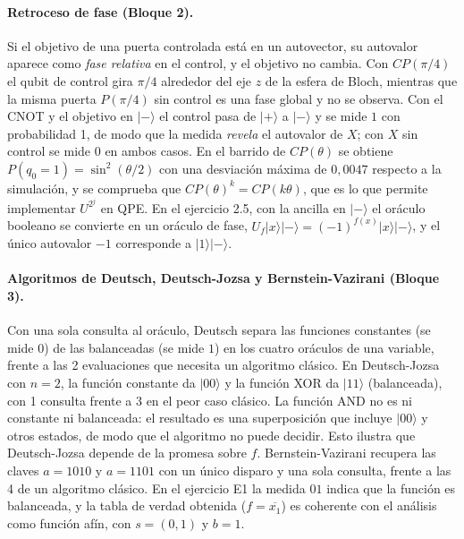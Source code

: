 \paragraph{Retroceso de fase (Bloque 2).} Si el objetivo de una puerta controlada está en un autovector, su autovalor aparece como \emph{fase relativa} en el control, y el objetivo no cambia.
Con $CP(\pi/4)$ el qubit de control gira $\pi/4$ alrededor del eje $z$ de la esfera de Bloch, mientras que la misma puerta $P(\pi/4)$ sin control es una fase global y no se observa.
Con el CNOT y el objetivo en $|{-}\rangle$ el control pasa de $|{+}\rangle$ a $|{-}\rangle$ y se mide $1$ con probabilidad 1, de modo que la medida \emph{revela} el autovalor de $X$;
con $X$ sin control se mide $0$ en ambos casos. En el barrido de $CP(\theta)$ se obtiene $P(q_0=1)=\sin^2(\theta/2)$ con una desviación máxima de $0{,}0047$ respecto a la simulación,
y se comprueba que $CP(\theta)^k=CP(k\theta)$, que es lo que permite implementar $U^{2^j}$ en QPE. En el ejercicio 2.5, con la ancilla en $|{-}\rangle$ el oráculo booleano se convierte
en un oráculo de fase, $U_f|x\rangle|{-}\rangle=(-1)^{f(x)}|x\rangle|{-}\rangle$, y el único autovalor $-1$ corresponde a $|1\rangle|{-}\rangle$.

\paragraph{Algoritmos de Deutsch, Deutsch-Jozsa y Bernstein-Vazirani (Bloque 3).} Con una sola consulta al oráculo, Deutsch separa las funciones constantes (se mide $0$) de las balanceadas (se mide $1$)
en los cuatro oráculos de una variable, frente a las 2 evaluaciones que necesita un algoritmo clásico. En Deutsch-Jozsa con $n=2$, la función constante da $|00\rangle$ y la función XOR
da $|11\rangle$ (balanceada), con 1 consulta frente a 3 en el peor caso clásico. La función AND no es ni constante ni balanceada: el resultado es una superposición que incluye $|00\rangle$ y otros estados, de modo que el algoritmo
no puede decidir. Esto ilustra que Deutsch-Jozsa depende de la promesa sobre $f$. Bernstein-Vazirani recupera las claves $a=1010$ y $a=1101$ con un único disparo y una sola consulta, frente a las 4 de un algoritmo clásico.
En el ejercicio E1 la medida $01$ indica que la función es balanceada, y la tabla de verdad obtenida ($f=\overline{x_1}$) es coherente con el análisis como función afín, con $s=(0,1)$ y $b=1$.

